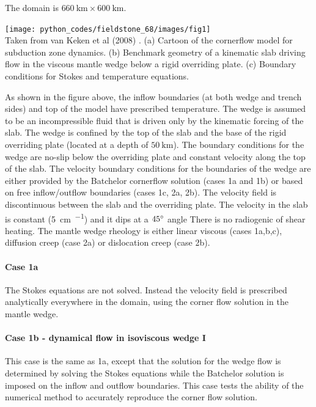 The domain is $660~\si{\km} \times 600~\si{\km}$. 

\begin{center}
\texttt{[image: python\_codes/fieldstone\_68/images/fig1]}\\
{\captionfont Taken from van Keken et al (2008) \cite{vack08}.
(a) Cartoon of the cornerflow model for subduction zone dynamics. 
(b) Benchmark geometry of a kinematic slab driving flow in the viscous
mantle wedge below a rigid overriding plate. 
(c) Boundary conditions for Stokes and temperature equations.}
\end{center}

As shown in the figure above, 
the inflow boundaries (at both wedge and trench sides) and top of the model 
have prescribed temperature. The wedge is assumed to be an incompressible fluid that
is driven only by the kinematic forcing of the slab. The wedge is
confined by the top of the slab and the base of the rigid overriding
plate (located at a depth of $50~\si{\km}$). 
The boundary conditions for the wedge are no-slip below the overriding plate and constant velocity
along the top of the slab. The velocity boundary conditions for the
boundaries of the wedge are either provided by the Batchelor cornerflow 
solution (cases 1a and 1b) or based on free inflow/outflow
boundaries (cases 1c, 2a, 2b). The velocity field is discontinuous between the slab
and the overriding plate.
The velocity in the slab is constant (5~\si{\cm\per\year}) and it dips at a $45\degree$ angle
There is no radiogenic of shear heating.
The mantle wedge rheology is either linear viscous (cases 1a,b,c),
diffusion creep (case 2a) or dislocation creep (case 2b).





\paragraph{Case 1a} The Stokes equations are not solved. Instead the velocity field
is prescribed analytically everywhere in the domain, using the corner flow solution 
in the mantle wedge. 

\paragraph{Case 1b - dynamical flow in isoviscous wedge I}
This case is the same as 1a, except that the solution
for the wedge flow is determined by solving the Stokes equations while the Batchelor solution is
imposed on the inflow and outflow boundaries. This case tests the ability of the numerical method
to accurately reproduce the corner flow solution.

